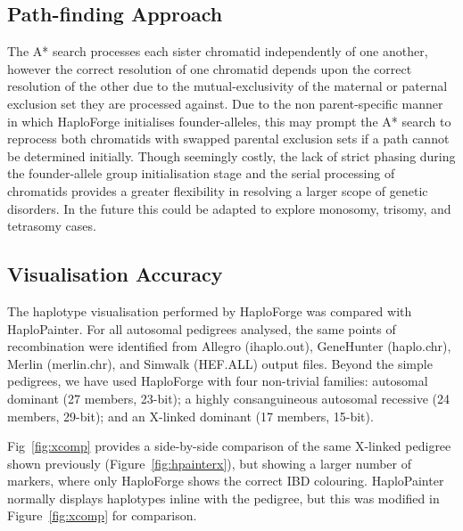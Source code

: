 \documentclass{bioinfo}
\numberwithin{equation}{section}
\def\haplo{{HaploForge}}
\def\hpainter{{HaploPainter}}
\begin{document}
\subsection{Path-finding Approach}

The A* search processes each sister chromatid independently of one another, however the correct resolution of one chromatid depends upon the correct resolution of the other due to the mutual-exclusivity of the maternal or paternal exclusion set they are processed against. Due to the non parent-specific manner in which \haplo{} initialises founder-alleles, this may prompt the A* search to reprocess both chromatids with swapped parental exclusion sets if a path cannot be determined initially. 
Though seemingly costly, the lack of strict phasing during the founder-allele group initialisation stage and the serial processing of chromatids provides a greater flexibility in resolving a larger scope of genetic disorders. 
In the future this could be adapted to explore monosomy, trisomy, and tetrasomy cases.


\subsection{Visualisation Accuracy}

The haplotype visualisation performed by \haplo{} was compared with \hpainter{}. For all autosomal pedigrees analysed, the same points of recombination were identified from Allegro (ihaplo.out), GeneHunter (haplo.chr), Merlin (merlin.chr), and Simwalk (HEF.ALL) output files. Beyond the simple pedigrees, we have used \haplo{} with four non-trivial families: autosomal dominant (27 members, 23-bit); a highly consanguineous autosomal recessive (24 members, 29-bit); and an X-linked dominant (17 members, 15-bit).

Fig~\ref{fig:xcomp} provides a side-by-side comparison of the same X-linked pedigree shown previously (Figure~\ref{fig:hpainterx}), but showing a larger number of markers, where only \haplo{} shows the correct IBD colouring. \hpainter{} normally displays haplotypes inline with the pedigree, but this was modified in Figure~\ref{fig:xcomp} for comparison.
\end{document}
